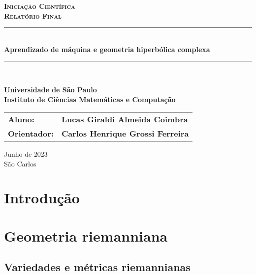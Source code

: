 \documentclass{article}
\begin{document}
\begin{titlepage}
    \center
    \textsc{\textbf{\Large Iniciação Científica}}\\[0.5cm]
    \textsc{\textbf{\large Relatório Final}}\\[0.5cm]
    
    \vspace{4cm}
    
    \rule{\linewidth}{0.5mm}\\[0.4cm]
    {\huge \textbf{Aprendizado de máquina e geometria hiperbólica complexa}}
    \rule{\linewidth}{0.5mm}\\[1.0cm]
    
    \vspace{1.0cm}
    
    \textbf{\Large{Universidade de São Paulo}}\\[0.2cm]
    \textbf{\large{Instituto de Ciências Matemáticas e Computação}}
    \vspace{4cm}
    
    \begin{flushright}
        \begin{tabular}{@{}ll@{}}
            \hspace{1cm}\textbf{\large{Aluno:}} & \textbf{\large{Lucas Giraldi Almeida Coimbra}}\\
            \hspace{1cm}\textbf{\large{Orientador:}} & \textbf{\large{Carlos Henrique Grossi Ferreira}}\\
            \end{tabular}
    \end{flushright}
    
    \vfill
    \Large{Junho de 2023}\\[0.2cm]
    \Large{São Carlos}
\end{titlepage}

\newpage

\tableofcontents

\newpage

\section{Introdução}

\section{Geometria riemanniana}

\subsection{Variedades e métricas riemannianas}
\end{document}
